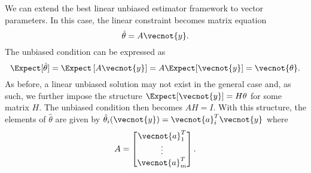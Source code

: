 We can extend the best linear unbiased estimator framework to vector parameters.
In this case, the linear constraint becomes matrix equation
\begin{equation*}
\hat{\theta} = A \vecnot{y} .
\end{equation*}
The unbiased condition can be expressed as
\begin{equation*}
\Expect [ \hat{\theta} ]
= \Expect \left[ A \vecnot{y} \right]
= A \Expect [ \vecnot{y} ] = \vecnot{\theta} .
\end{equation*}
As before, a linear unbiased solution may not exist in the general case and, as such, we further impose the structure $\Expect [ \vecnot{y} ] = H \theta$ for some matrix $H$.
The unbiased condition then becomes $A H = I$.
With this structure, the elements of $\hat{\theta}$ are given by $\hat{\theta}_i (\vecnot{y}) = \vecnot{a}_i^T \vecnot{y}$ where
\begin{equation*}
A = \begin{bmatrix} \vecnot{a}_1^T \\ 
\vdots \\ \vecnot{a}_m^T \end{bmatrix} .
\end{equation*}
